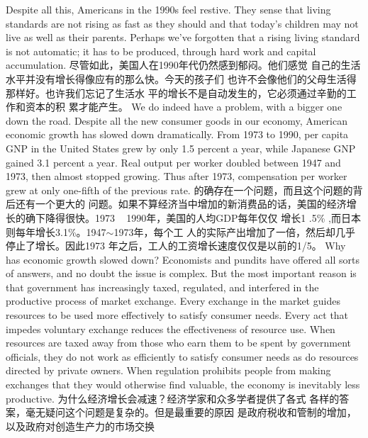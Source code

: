 \begin{paracol}{2}
Despite all this, Americans in the 1990s feel restive. They sense
that living standards are not rising as fast as they should and
that today's children may not live as well as their parents. Perhaps we've forgotten that a rising living standard is not automatic; it has to be produced, through hard work and capital
accumulation.
\switchcolumn
尽管如此，美国人在1990年代仍然感到郁闷。他们感觉
自己的生活水平并没有增长得像应有的那么快。今天的孩子们
也许不会像他们的父母生活得那样好。也许我们忘记了生活水
平的增长不是自动发生的，它必须通过辛勤的工作和资本的积
累才能产生。
\switchcolumn*
We do indeed have a problem, with a bigger one down the
road. Despite all the new consumer goods in our economy,
American economic growth has slowed down dramatically.
From 1973 to 1990, per capita GNP in the United States grew
by only 1.5 percent a year, while Japanese GNP gained 3.1 percent a year. Real output per worker doubled between 1947 and
1973, then almost stopped growing. Thus after 1973, compensation per worker grew at only one-fifth of the previous rate.
\switchcolumn
的确存在一个问题，而且这个问题的背后还有一个更大的
问题。如果不算经济当中增加的新消费品的话，美国的经济增
长的确下降得很快。1973 ~ 1990年，美国的人均GDP每年仅仅
增长1 .5\% ,而日本则每年增长3.1\%。1947$\sim$1973年，每个工
人的实际产出增加了一倍，然后却几乎停止了增长。因此1973
年之后，工人的工资增长速度仅仅是以前的1/5。
\switchcolumn*
Why has economic growth slowed down? Economists and
pundits have offered all sorts of answers, and no doubt the issue
is complex. But the most important reason is that government
has increasingly taxed, regulated, and interfered in the productive process of market exchange. Every exchange in the market
guides resources to be used more effectively to satisfy consumer
needs. Every act that impedes voluntary exchange reduces the
effectiveness of resource use. When resources are taxed away
from those who earn them to be spent by government officials,
they do not work as efficiently to satisfy consumer needs as do
resources directed by private owners. When regulation prohibits people from making exchanges that they would otherwise find valuable, the economy is inevitably less productive.
\switchcolumn
为什么经济增长会减速？经济学家和众多学者提供了各式
各样的答案，毫无疑问这个问题是复杂的。但是最重要的原因
是政府税收和管制的增加，以及政府对创造生产力的市场交换

\end{paracol}
